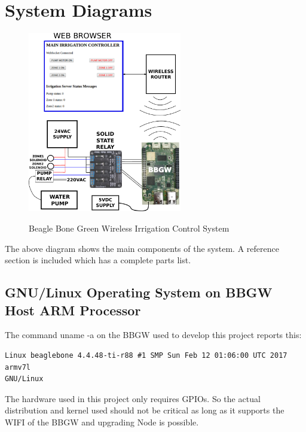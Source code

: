 %
%
%

\chapter{System Diagrams}

\begin{figure}[H]
	\centering
	\includegraphics[width=0.6\textwidth]{diagrams/system_diagram}
	\centering\bfseries
	\caption{Beagle Bone Green Wireless Irrigation Control System}
\end{figure}

The above diagram shows the main components of the system.  A reference section 
is included which has a complete parts list.


\section{GNU/Linux Operating System on BBGW Host ARM Processor}

The command uname -a on the BBGW used to develop this project reports this:

\begin{verbatim}
Linux beaglebone 4.4.48-ti-r88 #1 SMP Sun Feb 12 01:06:00 UTC 2017 armv7l 
GNU/Linux
\end{verbatim}

The hardware used in this project only requires GPIOs.  So the actual 
distribution and kernel used should not be critical as long as it supports the 
WIFI of the BBGW and upgrading Node is possible.






